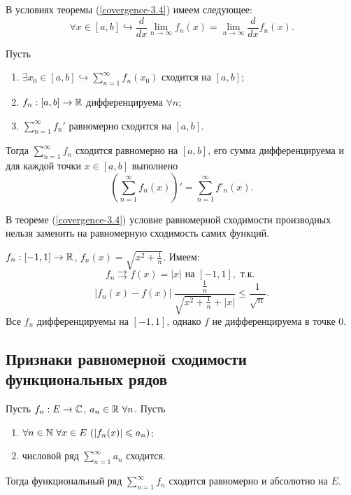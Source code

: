 
\begin{note}
    В условиях теоремы (\ref{covergence-3.4}) имеем следующее:
    \[\forall x \in [a, b] \hookrightarrow \frac{d}{dx}\lim_{n \to \infty} f_{n}(x) = \lim_{n \to \infty} \frac{d}{dx}f_{n}(x).\]
\end{note}

\begin{corollary}
    Пусть
    \begin{enumerate}
        \item $\exists x_{0} \in [a, b] \hookrightarrow \sum_{n = 1}^{\infty} f_{n}(x_{0})$ сходится на $[a, b]$;
        \item $f_{n}: [a, b] \to \mathbb{R}$ дифференцируема $\forall n$;
        \item $\sum_{n = 1}^{\infty} f_{n}'$ равномерно сходится на $[a, b]$.
    \end{enumerate}
    Тогда $\sum_{n = 1}^{\infty} f_{n}$ сходится равномерно на $[a, b]$, его сумма дифференцируема и для каждой точки $x \in [a, b]$ выполнено
    \[\left(\sum_{n = 1}^{\infty} f_{n}(x)\right)' = \sum_{n = 1}^{\infty} f'_{n}(x).\]
\end{corollary}

\begin{note}
    В теореме (\ref{covergence-3.4}) условие равномерной сходимости производных нельзя заменить на равномерную сходимость самих функций.
\end{note}

\begin{example}
    $f_{n}: [-1, 1] \to \mathbb{R}$, $f_{n}(x) = \sqrt{x^2 + \frac{1}{n}}$. Имеем:
    \[f_{n} \rightrightarrows f(x) = |x| \text{ на } [-1, 1], \text{ т.к. }\]
    \[|f_{n}(x) - f(x)| \ \frac{\frac{1}{n}}{\sqrt{x^{2} + \frac{1}{n}} + |x|} \leq \frac{1}{\sqrt{n}}.\]
    Все $f_{n}$ дифференцируемы на $[-1, 1]$, однако $f$ не дифференцируема в точке $0$. 
\end{example}

\subsection{Признаки равномерной сходимости функциональных рядов}

\begin{theorem}
    \label{convergence-3.5}
    Пусть $f_{n}: E \to \mathbb{C}$, $a_{n} \in \mathbb{R} \ \forall n$. Пусть
    \begin{enumerate}
        \item $\forall n \in \N \ \forall x \in E \ (|f_{n}(x)| \leq a_{n})$;
        \item числовой ряд $\sum_{n = 1}^{\infty}a_{n}$ сходится.
    \end{enumerate}
    Тогда функциональный ряд $\sum_{n = 1}^{\infty} f_{n}$ сходится равномерно и абсолютно на $E$.
\end{theorem}

